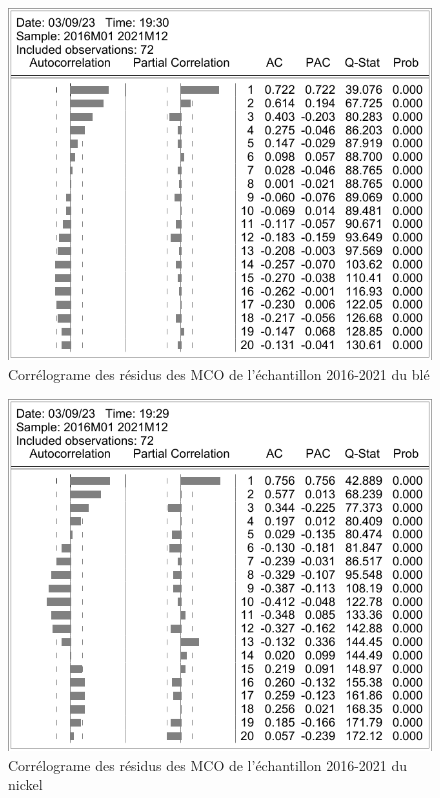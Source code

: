 \documentclass[12pt,a4paper]{article}
\begin{document}
\begin{figure}[H]
    \centering
    \includegraphics[]{annexe/3_2_mco_corr_ble.pdf}
    \caption{Corrélograme des résidus des MCO de l'échantillon 2016-2021 du blé}
    \label{fig:mco_cor_ble21}
\end{figure}

\begin{figure}[H]
    \centering
    \includegraphics[]{annexe/3_2_mco_corr_nickel.pdf}
    \caption{Corrélograme des résidus des MCO de l'échantillon 2016-2021 du nickel}
    \label{fig:mco_cor_nickel21}
\end{figure}
\end{document}
